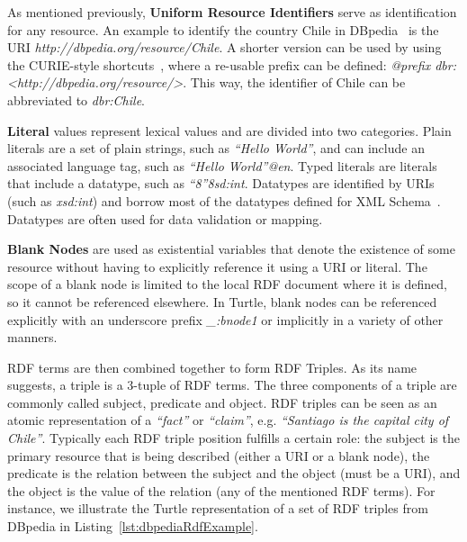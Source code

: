 As mentioned previously, \textbf{Uniform Resource Identifiers} serve as identification for 
any resource. An example to identify the country Chile in DBpedia~\cite{KG:dbpedia} is 
the URI \linebreak \textit{http://dbpedia.org/resource/Chile}. A shorter version can be used 
by using the CURIE-style shortcuts~\cite{key:prefixes}, where a re-usable prefix can be 
defined: \textit{@prefix dbr: <http://dbpedia.org/resource/>}. This way, the 
identifier of Chile can be abbreviated to \textit{dbr:Chile}.

\textbf{Literal} values represent lexical values and are divided into two categories. 
Plain literals are a set of plain strings, such as \textit{“Hello World”}, and can include 
an associated language tag, such as \textit{“Hello World”@en}. Typed literals are literals 
that include a datatype, such as \textit{“8”^^xsd:int}. Datatypes are identified by URIs 
(such as \textit{xsd:int}) and borrow most of the datatypes defined for XML Schema~\cite{key:xsd}. 
Datatypes are often used for data validation or mapping.

\textbf{Blank Nodes} are used as existential variables that denote the existence of some 
resource without having to explicitly reference it using a URI or literal. The scope of a 
blank node is limited to the local RDF document where it is defined, so it cannot be 
referenced elsewhere. In Turtle, blank nodes can be referenced explicitly with an 
underscore prefix \textit{\_:bnode1} or implicitly in a variety of other manners.

RDF terms are then combined together to form RDF Triples. As its name suggests, a triple 
is a 3-tuple of RDF terms. The three components of a triple are commonly called subject, 
predicate and object. RDF triples can be seen as an atomic representation of a \textit{“fact”} 
or \textit{“claim”}, e.g. \textit{“Santiago is the capital city of Chile”}. Typically each 
RDF triple position fulfills a certain role: the subject is the primary resource that is 
being described (either a URI or a blank node), the predicate is the relation between the 
subject and the object (must be a URI), and the object is the value of the relation 
(any of the mentioned RDF terms). For instance, we illustrate the Turtle representation 
of a set of RDF triples from DBpedia in Listing~\ref{lst:dbpediaRdfExample}.

